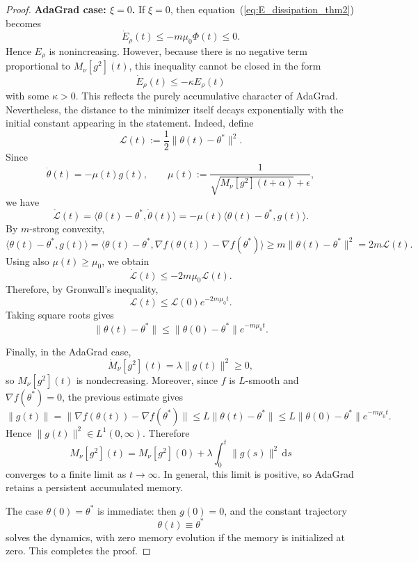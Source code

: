 \documentclass[10pt,a4paper]{amsart}
\begin{document}
\begin{proof}
\noindent\textbf{AdaGrad case: \(\xi=0\).}
If \(\xi=0\), then equation~(\ref{eq:E_dissipation_thm2}) becomes
\[
\dot E_\rho(t)
\le
-
m\mu_0\Phi(t)
\le 0.
\]
Hence \(E_\rho\) is nonincreasing. However, because there is no negative term proportional to \(M_\nu[g^2](t)\), this inequality cannot be closed in the form
\[
\dot E_\rho(t)\le -\kappa E_\rho(t)
\]
with some \(\kappa>0\). This reflects the purely accumulative character of AdaGrad. Nevertheless, the distance to the minimizer itself decays exponentially with the initial constant appearing in the statement. Indeed, define
\[
\mathcal L(t)
:=
\frac12\|\theta(t)-\theta^*\|^2.
\]
Since
\[
\dot\theta(t)=-\mu(t)g(t),
\qquad
\mu(t):=
\frac{1}{\sqrt{M_\nu[g^2](t+\alpha)}+\epsilon},
\]
we have
\[
\dot{\mathcal L}(t)
=
\langle \theta(t)-\theta^*,\dot\theta(t)\rangle
=
-\mu(t)\langle \theta(t)-\theta^*,g(t)\rangle.
\]
By \(m\)-strong convexity,
\[
\langle \theta(t)-\theta^*,g(t)\rangle
=
\langle \theta(t)-\theta^*,
\nabla f(\theta(t))-\nabla f(\theta^*)\rangle
\ge
m\|\theta(t)-\theta^*\|^2
=
2m\mathcal L(t).
\]
Using also \(\mu(t)\ge\mu_0\), we obtain
\[
\dot{\mathcal L}(t)
\le
-2m\mu_0\mathcal L(t).
\]
Therefore, by Gronwall's inequality,
\[
\mathcal L(t)
\le
\mathcal L(0)e^{-2m\mu_0t}.
\]
Taking square roots gives
\[
\|\theta(t)-\theta^*\|
\le
\|\theta(0)-\theta^*\|e^{-m\mu_0t}.
\]

Finally, in the AdaGrad case,
\[
\dot M_\nu[g^2](t)
=
\lambda\|g(t)\|^2
\ge 0,
\]
so \(M_\nu[g^2](t)\) is nondecreasing. Moreover, since \(f\) is \(L\)-smooth and \(\nabla f(\theta^*)=0\), the previous estimate gives
\[
\|g(t)\|
=
\|\nabla f(\theta(t))-\nabla f(\theta^*)\|
\le
L\|\theta(t)-\theta^*\|
\le
L\|\theta(0)-\theta^*\|e^{-m\mu_0t}.
\]
Hence \(\|g(t)\|^2\in L^1(0,\infty)\). Therefore
\[
M_\nu[g^2](t)
=
M_\nu[g^2](0)
+
\lambda\int_0^t\|g(s)\|^2\,\mathrm ds
\]
converges to a finite limit as \(t\to\infty\). In general, this limit is positive, so AdaGrad retains a persistent accumulated memory.

The case \(\theta(0)=\theta^*\) is immediate: then \(g(0)=0\), and the constant trajectory
\[
\theta(t)\equiv \theta^*
\]
solves the dynamics, with zero memory evolution if the memory is initialized at zero. This completes the proof.
\end{proof}
\end{document}
